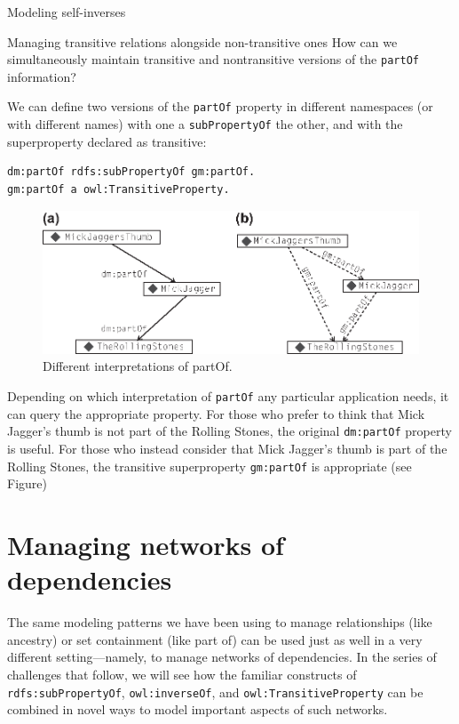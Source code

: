 \begin{challenge}{Modeling self-inverses}
\begin{challenge}{Managing transitive relations alongside non-transitive ones}
\label{chal:18}
How can we simultaneously maintain transitive and nontransitive versions
of the \texttt{partOf} information?

\solution

We can define two versions of the \texttt{partOf} property in different
namespaces (or with different names) with one a \texttt{subPropertyOf} the other,
and with the superproperty declared as transitive:

\begin{lstlisting}
dm:partOf rdfs:subPropertyOf gm:partOf.
gm:partOf a owl:TransitiveProperty.
\end{lstlisting}


\begin{figure}
\centering
\includegraphics[width=5in]{media/ch9/f09-005.eps}
\caption{Different interpretations of partOf.}
\label{fig:ch8.5}
\end{figure}



Depending on which interpretation of \texttt{partOf} any particular application
needs, it can query the appropriate property. For those who prefer to
think that Mick Jagger's thumb is not part of the Rolling Stones, the
original \texttt{dm:partOf} property is useful. For those who instead consider
that Mick Jagger's thumb is part of the Rolling Stones, the transitive
superproperty \texttt{gm:partOf} is appropriate (see Figure\label{fig:ch8.5})
\end{challenge}

\section{Managing networks of dependencies}

The same modeling patterns we have been using to manage relationships
(like ancestry) or set containment (like part of) can be used just as
well in a very different setting---namely, to manage networks of
dependencies. In the series of challenges that follow, we will see how
the familiar constructs of \texttt{rdfs:subPropertyOf}, \texttt{owl:inverseOf}, and
\texttt{owl:TransitiveProperty} can be combined in novel ways to model important
aspects of such networks.


\end{challenge}
